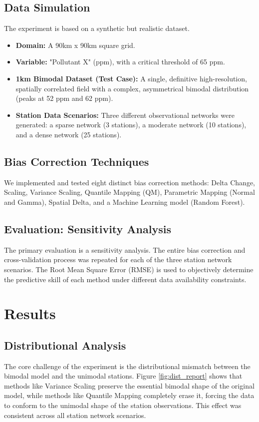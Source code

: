 \documentclass[11pt, a4paper]{article}
\begin{document}
\subsection{Data Simulation}
The experiment is based on a synthetic but realistic dataset.
\begin{itemize}
    \item \textbf{Domain:} A 90km x 90km square grid.
    \item \textbf{Variable:} "Pollutant X" (ppm), with a critical threshold of 65 ppm.
    \item \textbf{1km Bimodal Dataset (Test Case):} A single, definitive high-resolution, spatially correlated field with a complex, asymmetrical bimodal distribution (peaks at 52 ppm and 62 ppm).
    \item \textbf{Station Data Scenarios:} Three different observational networks were generated: a sparse network (3 stations), a moderate network (10 stations), and a dense network (25 stations).
\end{itemize}

\subsection{Bias Correction Techniques}
We implemented and tested eight distinct bias correction methods: Delta Change, Scaling, Variance Scaling, Quantile Mapping (QM), Parametric Mapping (Normal and Gamma), Spatial Delta, and a Machine Learning model (Random Forest).

\subsection{Evaluation: Sensitivity Analysis}
The primary evaluation is a sensitivity analysis. The entire bias correction and cross-validation process was repeated for each of the three station network scenarios. The Root Mean Square Error (RMSE) is used to objectively determine the predictive skill of each method under different data availability constraints.

\section{Results}

\subsection{Distributional Analysis}
The core challenge of the experiment is the distributional mismatch between the bimodal model and the unimodal stations. Figure \ref{fig:dist_report} shows that methods like Variance Scaling preserve the essential bimodal shape of the original model, while methods like Quantile Mapping completely erase it, forcing the data to conform to the unimodal shape of the station observations. This effect was consistent across all station network scenarios.
\end{document}
